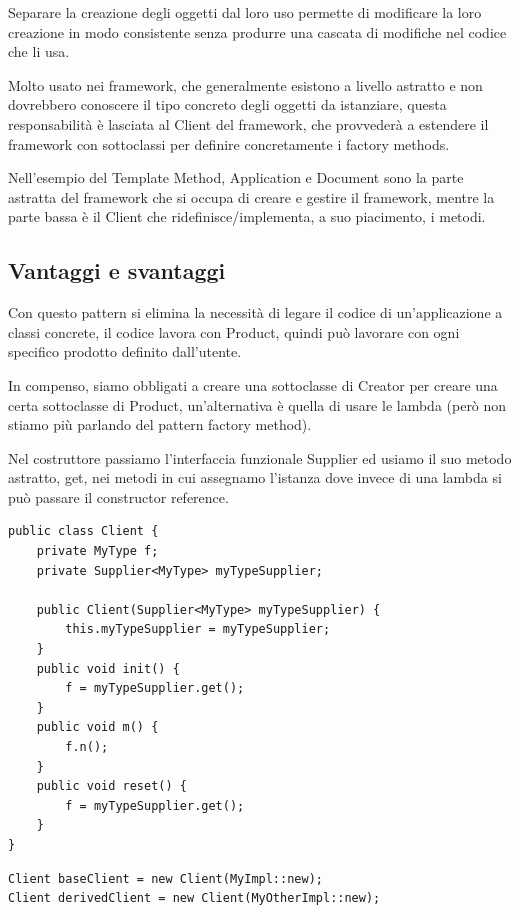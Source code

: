Separare la creazione degli oggetti dal loro uso permette di modificare la loro creazione in modo consistente senza produrre una cascata di modifiche nel codice che 
li usa.

Molto usato nei framework, che generalmente esistono a livello astratto e non dovrebbero conoscere il tipo concreto degli oggetti da istanziare, questa responsabilità 
è lasciata al Client del framework, che provvederà a estendere il framework con sottoclassi per definire concretamente i factory methods.

Nell'esempio del Template Method, Application e Document sono la parte astratta del framework che si occupa di creare e gestire il framework, mentre la parte bassa 
è il Client che ridefinisce/implementa, a suo piacimento, i metodi.

\subsection{Vantaggi e svantaggi}

Con questo pattern si elimina la necessità di legare il codice di un’applicazione a classi concrete, il codice lavora con Product, quindi può lavorare con ogni specifico
prodotto definito dall’utente.

In compenso, siamo obbligati a creare una sottoclasse di Creator per creare una certa sottoclasse di Product, un'alternativa è quella di usare le lambda 
(però non stiamo più parlando del pattern factory method). 

Nel costruttore passiamo l'interfaccia funzionale Supplier ed usiamo il suo metodo astratto, get, nei metodi in cui assegnamo l'istanza dove invece di una lambda si 
può passare il constructor reference.

\begin{multicols}{2}
\begin{lstlisting}
public class Client {
    private MyType f;
    private Supplier<MyType> myTypeSupplier;
    
    public Client(Supplier<MyType> myTypeSupplier) {
        this.myTypeSupplier = myTypeSupplier;
    }
    public void init() {
        f = myTypeSupplier.get();
    }
    public void m() {
        f.n();
    }
    public void reset() {
        f = myTypeSupplier.get();
    }
}
\end{lstlisting}           
\columnbreak
\begin{lstlisting}
Client baseClient = new Client(MyImpl::new);
Client derivedClient = new Client(MyOtherImpl::new);
\end{lstlisting}
\end{multicols}


